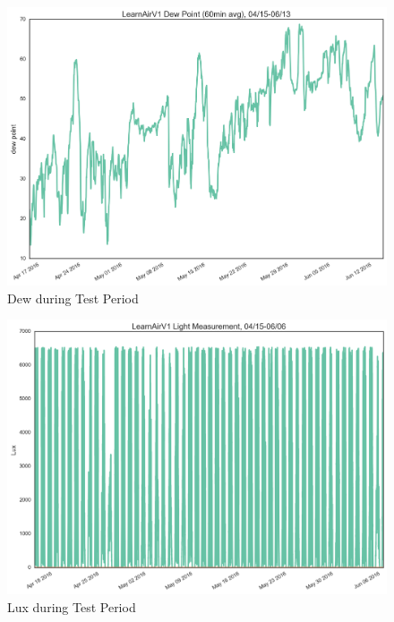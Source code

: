 \begin{figure}[htb]
 	\includegraphics[width=\textwidth]{figs/dew}               
 	 \caption{Dew during Test Period}
  	\label{fig:dew}
\end{figure}

\begin{figure}[htb]
 	\includegraphics[width=\textwidth]{figs/lux}               
 	 \caption{Lux during Test Period}
  	\label{fig:lux}
\end{figure}

